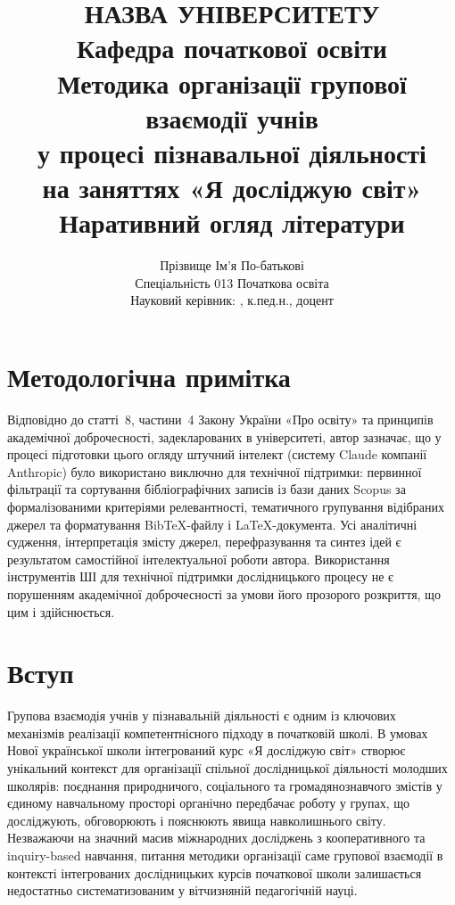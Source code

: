 \documentclass[a4paper,12pt]{article}
\title{%
  \large НАЗВА УНІВЕРСИТЕТУ\\[0.5em]
  \large Кафедра початкової освіти\\[2em]
  \LARGE\bfseries
  Методика організації групової взаємодії учнів\\
  у процесі пізнавальної діяльності\\
  на заняттях «Я досліджую світ»\\[1em]
  \large Наративний огляд літератури\\[2em]
}
\author{%
  Прізвище Ім'я По-батькові\\
  \small Спеціальність 013 Початкова освіта\\
  \small Науковий керівник: \underline{\hspace{6cm}}, к.пед.н., доцент
}
\date{\the\year}
\begin{document}
\maketitle
\thispagestyle{empty}
\newpage

\tableofcontents
\newpage


\section*{Методологічна примітка}

Відповідно до статті~8, частини~4 Закону України «Про освіту» та принципів академічної доброчесності, задекларованих в університеті, автор зазначає, що у процесі підготовки цього огляду штучний інтелект (систему Claude компанії Anthropic) було використано виключно для технічної підтримки: первинної фільтрації та сортування бібліографічних записів із бази даних Scopus за формалізованими критеріями релевантності, тематичного групування відібраних джерел та форматування BibTeX-файлу і LaTeX-документа. Усі аналітичні судження, інтерпретація змісту джерел, перефразування та синтез ідей є результатом самостійної інтелектуальної роботи автора. Використання інструментів ШІ для технічної підтримки дослідницького процесу не є порушенням академічної доброчесності за умови його прозорого розкриття, що цим і здійснюється.

\newpage


\section{Вступ}

Групова взаємодія учнів у пізнавальній діяльності є одним із ключових механізмів реалізації компетентнісного підходу в початковій школі. В умовах Нової української школи інтегрований курс «Я досліджую світ» створює унікальний контекст для організації спільної дослідницької діяльності молодших школярів: поєднання природничого, соціального та громадянознавчого змістів у єдиному навчальному просторі органічно передбачає роботу у групах, що досліджують, обговорюють і пояснюють явища навколишнього світу. Незважаючи на значний масив міжнародних досліджень з кооперативного та inquiry-based навчання, питання методики організації саме групової взаємодії в контексті інтегрованих дослідницьких курсів початкової школи залишається недостатньо систематизованим у вітчизняній педагогічній науці.
\end{document}
